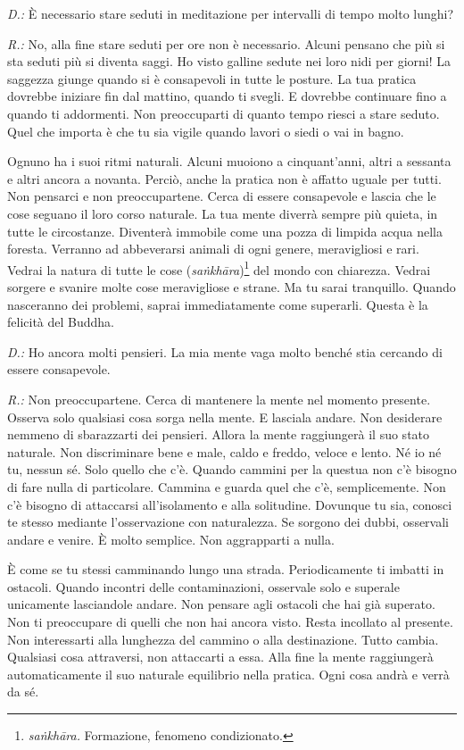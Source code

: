 \emph{D.:} È necessario stare seduti in meditazione per intervalli di tempo
molto lunghi?

\emph{R.:} No, alla fine stare seduti per ore non è necessario. Alcuni pensano
che più si sta seduti più si diventa saggi. Ho visto galline sedute nei
loro nidi per giorni! La saggezza giunge quando si è consapevoli in
tutte le posture. La tua pratica dovrebbe iniziare fin dal mattino,
quando ti svegli. E dovrebbe continuare fino a quando ti addormenti. Non
preoccuparti di quanto tempo riesci a stare seduto. Quel che importa è
che tu sia vigile quando lavori o siedi o vai in bagno.

Ognuno ha i suoi ritmi naturali. Alcuni muoiono a cinquant'anni, altri a
sessanta e altri ancora a novanta. Perciò, anche la pratica non è
affatto uguale per tutti. Non pensarci e non preoccupartene. Cerca di
essere consapevole e lascia che le cose seguano il loro corso naturale.
La tua mente diverrà sempre più quieta, in tutte le circostanze.
Diventerà immobile come una pozza di limpida acqua nella foresta.
Verranno ad abbeverarsi animali di ogni genere, meravigliosi e rari.
Vedrai la natura di tutte le cose (\emph{saṅkhāra})\footnote{\emph{saṅkhāra.}
  Formazione, fenomeno condizionato.} del mondo con chiarezza. Vedrai
sorgere e svanire molte cose meravigliose e strane. Ma tu sarai
tranquillo. Quando nasceranno dei problemi, saprai immediatamente come
superarli. Questa è la felicità del Buddha.

\emph{D.:} Ho ancora molti pensieri. La mia mente vaga molto benché stia
cercando di essere consapevole.

\emph{R.:} Non preoccupartene. Cerca di mantenere la mente nel momento
presente. Osserva solo qualsiasi cosa sorga nella mente. E lasciala
andare. Non desiderare nemmeno di sbarazzarti dei pensieri. Allora la
mente raggiungerà il suo stato naturale. Non discriminare bene e male,
caldo e freddo, veloce e lento. Né io né tu, nessun sé. Solo quello che
c'è. Quando cammini per la questua non c'è bisogno di fare nulla di
particolare. Cammina e guarda quel che c'è, semplicemente. Non c'è
bisogno di attaccarsi all'isolamento e alla solitudine. Dovunque tu sia,
conosci te stesso mediante l'osservazione con naturalezza. Se sorgono
dei dubbi, osservali andare e venire. È molto semplice. Non aggrapparti
a nulla.

È come se tu stessi camminando lungo una strada. Periodicamente ti
imbatti in ostacoli. Quando incontri delle contaminazioni, osservale
solo e superale unicamente lasciandole andare. Non pensare agli ostacoli
che hai già superato. Non ti preoccupare di quelli che non hai ancora
visto. Resta incollato al presente. Non interessarti alla lunghezza del
cammino o alla destinazione. Tutto cambia. Qualsiasi cosa attraversi,
non attaccarti a essa. Alla fine la mente raggiungerà automaticamente il
suo naturale equilibrio nella pratica. Ogni cosa andrà e verrà da sé.

